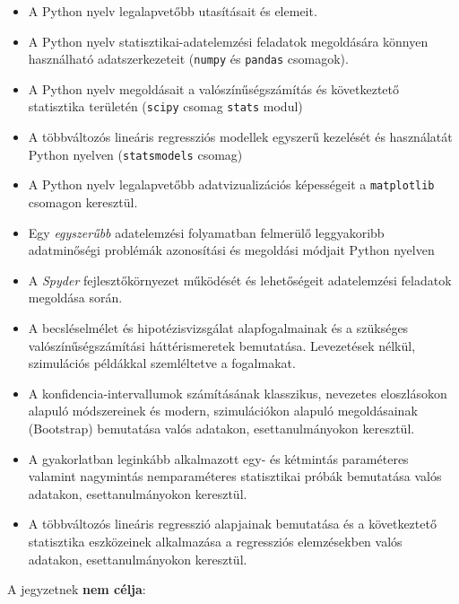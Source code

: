 \documentclass[
]{book}
\providecommand{\tightlist}{%
  \setlength{\itemsep}{0pt}\setlength{\parskip}{0pt}}
\begin{document}
\begin{itemize}
\tightlist
\item
  A Python nyelv legalapvetőbb utasításait és elemeit.
\item
  A Python nyelv statisztikai-adatelemzési feladatok megoldására könnyen használható adatszerkezeteit (\texttt{numpy} és \texttt{pandas} csomagok).
\item
  A Python nyelv megoldásait a valószínűségszámítás és következtető statisztika területén (\texttt{scipy} csomag \texttt{stats} modul)
\item
  A többváltozós lineáris regressziós modellek egyszerű kezelését és használatát Python nyelven (\texttt{statsmodels} csomag)
\item
  A Python nyelv legalapvetőbb adatvizualizációs képességeit a \texttt{matplotlib} csomagon keresztül.
\item
  Egy \emph{egyszerűbb} adatelemzési folyamatban felmerülő leggyakoribb adatminőségi problémák azonosítási és megoldási módjait Python nyelven
\item
  A \emph{Spyder} fejlesztőkörnyezet működését és lehetőségeit adatelemzési feladatok megoldása során.
\item
  A becsléselmélet és hipotézisvizsgálat alapfogalmainak és a szükséges valószínűségszámítási háttérismeretek bemutatása. Levezetések nélkül, szimulációs példákkal szemléltetve a fogalmakat.
\item
  A konfidencia-intervallumok számításának klasszikus, nevezetes eloszlásokon alapuló módszereinek és modern, szimulációkon alapuló megoldásainak (Bootstrap) bemutatása valós adatakon, esettanulmányokon keresztül.
\item
  A gyakorlatban leginkább alkalmazott egy- és kétmintás paraméteres valamint nagymintás nemparaméteres statisztikai próbák bemutatása valós adatakon, esettanulmányokon keresztül.
\item
  A többváltozós lineáris regresszió alapjainak bemutatása és a következtető statisztika eszközeinek alkalmazása a regressziós elemzésekben valós adatakon, esettanulmányokon keresztül.
\end{itemize}

A jegyzetnek \textbf{nem célja}:
\end{document}
